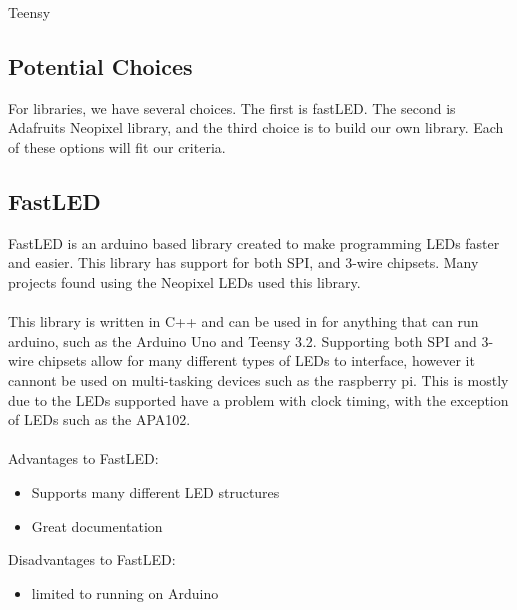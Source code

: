 Teensy\documentclass[onecolumn, draftclsnofoot,10pt, compsoc]{IEEEtran}
\begin{document}
		\subsection{Potential Choices}
		For libraries, we have several choices. The first is fastLED. The second is
		Adafruits Neopixel library, and the third choice is to build our own
		library. Each of these options will fit our criteria.
		\subsection{FastLED}
		FastLED is an arduino based library created to make programming LEDs
		faster and easier. This library has support for both SPI, and 3-wire
		chipsets\cite[Pg 2]{fastLED}. Many projects found using the Neopixel LEDs
		used this library.
		\\\\
		This library is written in C++ and can be used in for anything that can run
		arduino, such as the Arduino Uno and Teensy 3.2. Supporting both SPI and
		3-wire chipsets allow for many different types of LEDs to interface,
		however it cannont be used on multi-tasking devices such as the raspberry
		pi. This is mostly due to the LEDs supported have a problem with clock
		timing, with the exception of LEDs such as the APA102.
		\\\\
		Advantages to FastLED:
		\begin{itemize}
			\item Supports many different LED structures
			\item Great documentation
		\end{itemize}
		Disadvantages to FastLED:
		\begin{itemize}
			\item limited to running on Arduino
		\end{itemize}
\end{document}
